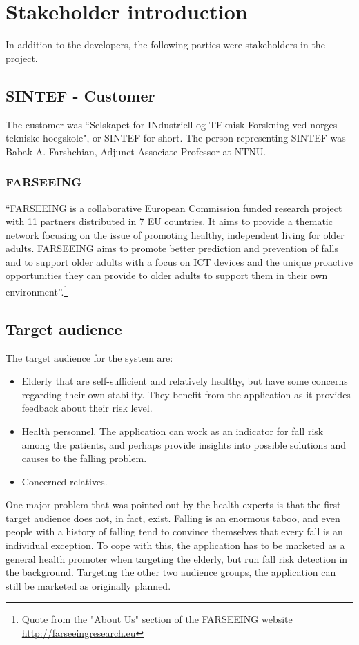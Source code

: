 \section{Stakeholder introduction}
In addition to the developers, the following parties were stakeholders in the project.

\subsection{SINTEF - Customer}
The customer was ``Selskapet for INdustriell og TEknisk Forskning ved norges tekniske hoegskole", or SINTEF for short. The person representing SINTEF was Babak A. Farshchian, Adjunct Associate Professor at NTNU.

\subsubsection{FARSEEING}
``FARSEEING is a collaborative European Commission funded research project with 11 partners distributed in 7 EU countries. It aims to provide a thematic network focusing on the issue of promoting healthy, independent living for older adults. FARSEEING aims to promote better prediction and prevention of falls and to support older adults with a focus on ICT devices and the unique proactive opportunities they can provide to older adults to support them in their own environment''.\footnote{Quote from the "About Us" section of the FARSEEING website \url{http://farseeingresearch.eu}}

\subsection{Target audience}
The target audience for the system are:
\begin{itemize}
\item Elderly that are self-sufficient and relatively healthy, but have some concerns regarding their own stability. They benefit from the application as it provides feedback about their risk level.
\item Health personnel. The application can work as an indicator for fall risk among the patients, and perhaps provide insights into possible 
solutions and causes to the falling problem.
\item Concerned relatives.
\end{itemize}

One major problem that was pointed out by the health experts is that the first target audience does not, in fact, exist. Falling is an enormous taboo, and even people with a history of falling tend to convince themselves that every fall is an individual exception. To cope with this, the application has to be marketed as a general health promoter when targeting the elderly, but run fall risk detection in the background. Targeting the other two audience  groups, the application can still be marketed as originally planned. 

